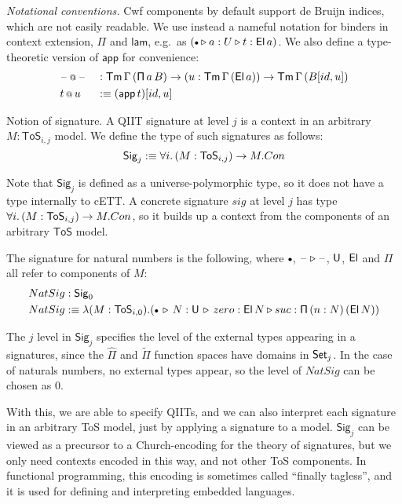 \documentclass{llncs}
\makeatletter
\newcommand{\ToS}{\mathsf{ToS}}
\newcommand{\ext}{\triangleright}
\newcommand{\emptycon}{\scaleobj{.75}\bullet}
\newcommand{\Pii}{\mathsf{\Pi}}
\newcommand{\appi}{\mathsf{app}}
\newcommand{\lami}{\mathsf{lam}}
\newcommand{\Pie}{\mathsf{\hat{\Pi}}}
\newcommand{\Piinf}{\mathsf{\tilde{\Pi}}}
\newcommand{\appitt}{\mathop{{\scriptstyle @}}}
\newcommand{\Sig}{\mathsf{Sig}}
\makeatother
\begin{document}
\emph{Notational conventions.} Cwf components by default support de Bruijn
indices, which are not easily readable. We use instead a nameful notation for
binders in context extension, $\Pii$ and $\lami$, e.g.\ as $(\emptycon \ext a :
U \ext t : \El\,a)$. We also define a type-theoretic version of $\appi$ for
convenience:
\begin{alignat*}{3}
  & \blank\appitt\blank && :
      \Tm\,\Gamma\,(\Pii\,a\,B)\ra
      (u : \Tm\,\Gamma\,(\El\,a)) \ra \Tm\,\Gamma\,(B[id, u])\\
  & t\appitt u && :\equiv (\appi\,t)[id, u]
\end{alignat*}

\begin{nidefinition}{Notion of signature.}
A QIIT signature at level $j$ is a context in an arbitrary $M : \ToS_{i,j}$
model. We define the type of such signatures as follows:
\[
  \Sig_j :\equiv \forall i.\,(M : \ToS_{i,j})\ra M.Con
\]

Note that $\Sig_j$ is defined as a universe-polymorphic type, so it does not
have a type internally to cETT. A concrete signature $sig$ at level $j$ has type
$\forall i.\,(M : \ToS_{i,j})\ra M.Con$, so it builds up a context from the
components of an arbitrary $\ToS$ model.

\begin{example}
The signature for natural
numbers is the following, where $\emptycon$, $\blank\ext\blank$, $\mathsf{U}$, $\mathsf{El}$ and
$\Pii$ all refer to components of $M$:
\begin{alignat*}{3}
  & NatSig : \Sig_0 \\
  & NatSig :\equiv \lambda (M : \ToS_{i,0}). (\emptycon\,\ext\, N : \U \,\ext\, zero : \El\,N \ext suc : \Pii\,(n : N)\,(\El\,N))
\end{alignat*}
\end{example}

The $j$ level in $\Sig_j$ specifies the level of the external types appearing in
a signatures, since the $\Pie$ and $\Piinf$ function spaces have domains in $\mathsf{Set}_j$.
In the case of naturals numbers, no external types appear, so the level of $NatSig$
can be chosen as $0$.

With this, we are able to specify QIITs, and we can also interpret each
signature in an arbitrary ToS model, just by applying a signature to a model.
$\Sig_j$ can be viewed as a precursor to a Church-encoding for the theory of
signatures, but we only need contexts encoded in this way, and not other ToS
components. In functional programming, this encoding is sometimes called
``finally tagless''\cite{TODO}, and it is used for defining and interpreting
embedded languages.
\end{nidefinition}
\end{document}
